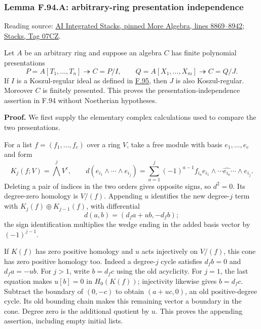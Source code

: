 \documentclass[11pt,a4paper,openany]{report}
\begin{document}
\label{AG-RG-S05-more-algebra-lemma-lci-presentation-independent}

\subsubsection{Lemma F.94.A: arbitrary-ring presentation independence}\label{AG-RG-S05-lemma-f.94.a-arbitrary-ring-presentation-independence}

Reading source: \href{https://github.com/KokunoYumeto/unofficial-stacks-project-ai-drafts/blob/565b10e987aba5969b21145a0833f42d69f96790/more-algebra.tex\#L8869-L8942}{AI Integrated Stacks, pinned More Algebra, lines 8869--8942}; \href{https://stacks.math.columbia.edu/tag/07CZ}{Stacks, Tag 07CZ}.

Let \(A\) be an arbitrary ring and suppose an algebra \(C\) has finite polynomial presentations \[P=A[T_1,\ldots,T_n]\twoheadrightarrow C=P/I,\qquad
Q=A[X_1,\ldots,X_m]\twoheadrightarrow C=Q/J.\] If \(I\) is a Koszul-regular ideal as defined in \hyperref[AG-RG-S05-more-algebra-definition-regular-ideal]{F.95}, then \(J\) is also Koszul-regular. Moreover \(C\) is finitely presented. This proves the presentation-independence assertion in F.94 without Noetherian hypotheses.

\textbf{Proof.} We first supply the elementary complex calculations used to compare the two presentations.

For a list \(f=(f_1,\ldots,f_c)\) over a ring \(V\), take a free module with basis \(e_1,\ldots,e_c\) and form \[K_j(f;V)=\bigwedge^jV^c,\qquad
d(e_{i_1}\wedge\cdots\wedge e_{i_j})
=\sum_{a=1}^j(-1)^{a-1}f_{i_a}
e_{i_1}\wedge\cdots\widehat{e_{i_a}}\cdots\wedge e_{i_j}.\] Deleting a pair of indices in the two orders gives opposite signs, so \(d^2=0\). Its degree-zero homology is \(V/(f)\). Appending \(u\) identifies the new degree-\(j\) term with \(K_j(f)\oplus K_{j-1}(f)\), with differential \[d(a,b)=(d_fa+ub,-d_fb);\] the sign identification multiplies the wedge ending in the added basis vector by \((-1)^{j-1}\).

If \(K(f)\) has zero positive homology and \(u\) acts injectively on \(V/(f)\), this cone has zero positive homology too. Indeed a degree-\(j\) cycle satisfies \(d_fb=0\) and \(d_fa=-ub\). For \(j>1\), write \(b=d_fc\) using the old acyclicity. For \(j=1\), the last equation makes \(u[b]=0\) in \(H_0(K(f))\); injectivity likewise gives \(b=d_fc\). Subtract the boundary of \((0,-c)\) to obtain \((a+uc,0)\), an old positive-degree cycle. Its old bounding chain makes this remaining vector a boundary in the cone. Degree zero is the additional quotient by \(u\). This proves the appending assertion, including empty initial lists.
\end{document}
